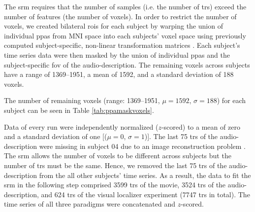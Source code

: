 


The \ac{srm} requires that the number of samples (i.e. the number of \acp{tr})
exceed the number of features (the number of voxels).
%
In order to restrict the number of voxels, we created bilateral \acp{roi} for
each subject by warping the union of individual \acp{ppa}
\citep[s.][]{haeusler2022processing} from MNI space into each subjects' voxel
space using previously computed subject-specific, non-linear transformation
matrices
\citep[][\href{https://github.com/psychoinformatics-de/studyforrest-data-templatetransforms
}{\url{github.com/psychoinformatics-de/studyforrest-data-templatetransforms}}]{hanke2014audiomovie}.
Each subject's time series data were then masked by the union of individual
\acp{ppa} and the subject-specific \ac{fov} of the audio-description.
The remaining voxels across subjects have a range of 1369--1951,
a mean of 1592, and a standard deviation of 188 voxels.

%
The number of remaining voxels (range: 1369--1951, $\mu=1592$, $\sigma=188$) for
each subject can be seen in Table \ref{tab:ppamaskvoxels}.



Data of every run were independently normalized ($z$-scored) to a mean of zero
and a standard deviation of one [($\mu=0$, $\sigma=1$)].
%
The last 75 \acp{tr} of the audio-description were missing in subject 04 due to
an image reconstruction problem \citep[s.][]{hanke2014audiomovie}.
%
The \ac{srm} allows the number of voxels to be different across subjects but the
number of \acp{tr} must be the same.
%
Hence, we removed the last 75 \acp{tr} of the audio-description from the all
other subjects' time series.
As a result, the data to fit the \ac{srm} in the following step comprised 3599
\acp{tr} of the movie, 3524 \acp{tr} of the audio-description, and 624 \acp{tr}
of the visual localizer experiment (7747 \acp{tr} in total).
The time series of all three paradigms were concatenated and $z$-scored.

